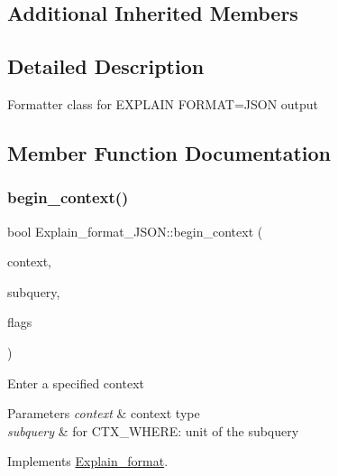 \subsection*{Additional Inherited Members}


\subsection{Detailed Description}
Formatter class for E\+X\+P\+L\+A\+IN F\+O\+R\+M\+AT=J\+S\+ON output 

\subsection{Member Function Documentation}
\mbox{\label{classExplain__format__JSON_a3de95e88857de347b30c13ca519c757f}} 
\subsubsection{\texorpdfstring{begin\+\_\+context()}{begin\_context()}}
{\footnotesize\ttfamily bool Explain\+\_\+format\+\_\+\+J\+S\+O\+N\+::begin\+\_\+context (\begin{DoxyParamCaption}\item[{enum\+\_\+parsing\+\_\+context}]{context,  }\item[{S\+E\+L\+E\+C\+T\+\_\+\+L\+E\+X\+\_\+\+U\+N\+IT $\ast$}]{subquery,  }\item[{const \mbox{\hyperlink{classExplain__format__flags}{Explain\+\_\+format\+\_\+flags}} $\ast$}]{flags }\end{DoxyParamCaption})\hspace{0.3cm}{\ttfamily [virtual]}}

Enter a specified context


\begin{DoxyParams}{Parameters}
{\em context} & context type \\
\hline
{\em subquery} & for C\+T\+X\+\_\+\+W\+H\+E\+RE\+: unit of the subquery \\
\hline
\end{DoxyParams}


Implements \mbox{\hyperlink{classExplain__format_aedfa1f1b941f522948707e4fa3368f79}{Explain\+\_\+format}}.


